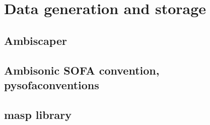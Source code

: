 \chapter{Data generation and storage}
\label{chap:data}

\section{Ambiscaper}
\section{Ambisonic SOFA convention, pysofaconventions}
\section{masp library}

